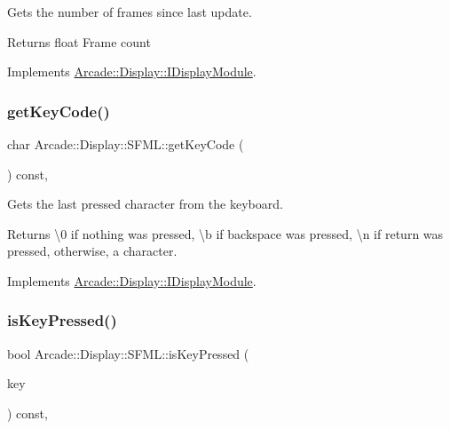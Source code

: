 Gets the number of frames since last update. 

\begin{DoxyReturn}{Returns}
float Frame count 
\end{DoxyReturn}


Implements \mbox{\hyperlink{classArcade_1_1Display_1_1IDisplayModule_aab078d82e6fdd32682553947c20226ac}{Arcade\+::\+Display\+::\+I\+Display\+Module}}.

\mbox{\label{classArcade_1_1Display_1_1SFML_ae2bf9e9c157a9f0ae8d1b60bd072e881}} 
\subsubsection{\texorpdfstring{getKeyCode()}{getKeyCode()}}
{\footnotesize\ttfamily char Arcade\+::\+Display\+::\+S\+F\+M\+L\+::get\+Key\+Code (\begin{DoxyParamCaption}{ }\end{DoxyParamCaption}) const\hspace{0.3cm}{\ttfamily [final]}, {\ttfamily [virtual]}}



Gets the last pressed character from the keyboard. 

\begin{DoxyReturn}{Returns}
\textbackslash{}0 if nothing was pressed, \textbackslash{}b if backspace was pressed, \textbackslash{}n if return was pressed, otherwise, a character. 
\end{DoxyReturn}


Implements \mbox{\hyperlink{classArcade_1_1Display_1_1IDisplayModule_a403f8a0f065dad707a881ef3cee79805}{Arcade\+::\+Display\+::\+I\+Display\+Module}}.

\mbox{\label{classArcade_1_1Display_1_1SFML_ad33097d101e94bbb65ea4eed560e03c4}} 
\subsubsection{\texorpdfstring{isKeyPressed()}{isKeyPressed()}}
{\footnotesize\ttfamily bool Arcade\+::\+Display\+::\+S\+F\+M\+L\+::is\+Key\+Pressed (\begin{DoxyParamCaption}\item[{\mbox{\hyperlink{classArcade_1_1Display_1_1IDisplayModule_a8da3f6b309ca0581473ae8cc8789b619}{I\+Display\+Module\+::\+Keys}}}]{key }\end{DoxyParamCaption}) const\hspace{0.3cm}{\ttfamily [final]}, {\ttfamily [virtual]}}



